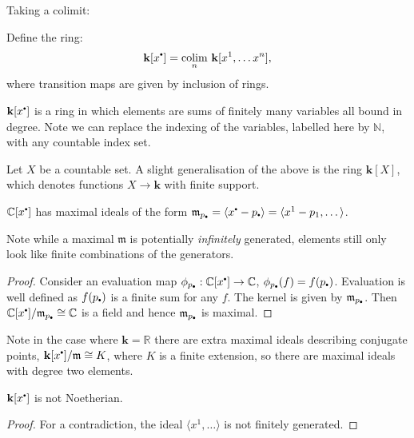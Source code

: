     Taking a colimit: 
    
    \begin{defn}
    Define the ring: \[ \mathbf{k}[x^{\sbt}] = \colim_n \, \mathbf{k}[x^1, \dots x^{n}], \]
    where transition maps are given by inclusion of rings.
    \end{defn}
    
    \(\mathbf{k}[x^{\sbt}]\) is a ring in which elements are sums of finitely many variables all bound in degree. Note we can replace the indexing of the variables, labelled here by \( \mathbb{N}\), with any countable index set. 
    
    Let \(X\) be a countable set. A slight generalisation of the above is the ring \( \mathbf{k}[X]\), which denotes functions \(X \rightarrow \mathbf{k}\) with finite support.
    
    \begin{lem} \( \mathbb{C}[x^{\sbt}]\) has maximal ideals of the form \(\mathfrak{m}_{p_{\sbt}}= \langle x^{\sbt} - p_{\sbt} \rangle =  \langle x^{1} - p_1 , \dots \rangle \).
    \end{lem}
    
    Note while a maximal \( \mathfrak{m}\) is potentially \emph{infinitely} generated, elements still only look like finite combinations of the generators.
    
    \begin{proof}
    Consider an evaluation map \(\phi_{p_{\sbt}} :  \mathbb{C}[x^{\sbt}]  \rightarrow \mathbb{C}\), \( \phi_{p_{\sbt}}(f) = f(p_{\sbt}) \). Evaluation is well defined as \(f(p_{\sbt})\) is a finite sum for any \(f\). The kernel is given by \( \mathfrak{m}_{p_{\sbt}}\). Then \( \mathbb{C}[x^{\sbt}]/\mathfrak{m}_{p_{\sbt}} \cong \mathbb{C}\) is a field and hence \( \mathfrak{m}_{p_{\sbt}}\) is maximal. 
    \end{proof}
    
    Note in the case where \( \mathbf{k} = \mathbb{R}\) there are extra maximal ideals describing conjugate points, \( \mathbf{k}[x^{\sbt}]/\mathfrak{m} \cong  K \), where \(K\) is a finite extension, so there are maximal ideals with degree two elements.
    
    \begin{lem} \( \mathbf{k}[x^{\sbt}]\) is not Noetherian.
    \end{lem}

    \begin{proof}
    For a contradiction, the ideal \( \langle x^1, \dots \rangle \) is not finitely generated.
    \end{proof}

